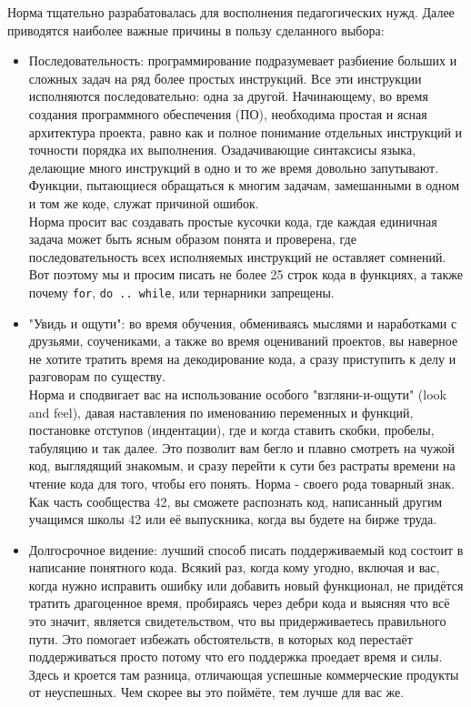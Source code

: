\documentclass{42-ru}
\begin{document}
    Норма тщательно разрабатовалась для восполнения педагогических нужд.
    Далее приводятся наиболее важные причины в пользу сделанного выбора:
    \begin{itemize}

        \item Последовательность: программирование подразумевает разбиение больших и сложных задач
            на ряд более простых инструкций. Все эти инструкции исполняются последовательно:
            одна за другой. Начинающему, во время создания программного обеспечения (ПО), необходима
            простая и ясная архитектура проекта, равно как и полное понимание отдельных инструкций и
            точности порядка их выполнения. Озадачивающие синтаксисы языка, делающие много инструкций
            в одно и то же время довольно запутывают. Функции, пытающиеся обращаться к многим задачам,
            замешанными в одном и том же коде, служат причиной ошибок.\\
            Норма просит вас создавать простые кусочки кода, где каждая единичная задача может быть
            ясным образом понята и проверена, где последовательность всех исполняемых инструкций
            не оставляет сомнений. Вот поэтому мы и просим писать не более 25 строк кода в функциях,
            а также почему \texttt{for}, \texttt{do .. while}, или тернарники запрещены.

        \item "Увидь и ощути": во время обучения, обмениваясь мыслями и наработками с друзьями,
            соучениками, а также во время оцениваний проектов, вы наверное не хотите тратить время
            на декодирование кода, а сразу приступить к делу и разговорам по существу.\\
            Норма и сподвигает вас на использование особого "взгляни-и-ощути" (look and feel),
            давая наставления по именованию переменных и функций, постановке отступов (индентации),
            где и когда ставить скобки, пробелы, табуляцию и так далее.
            Это позволит вам бегло и плавно смотреть на чужой код, выглядящий знакомым, и сразу перейти
            к сути без растраты времени на чтение кода для того, чтобы его понять.
            Норма - своего рода товарный знак. Как часть сообщества 42, вы сможете распознать код,
            написанный другим учащимся школы 42 или её выпускника, когда вы будете на бирже труда.
    
        \item Долгосрочное видение: лучший способ писать поддерживаемый код состоит в написание понятного кода.
            Всякий раз, когда кому угодно, включая и вас, когда нужно исправить ошибку или добавить новый функционал,
            не придётся тратить драгоценное время, пробираясь через дебри кода и выясняя что всё это значит,
            является свидетельством, что вы придерживаетесь правильного пути. Это помогает избежать обстоятельств,
            в которых код перестаёт поддерживаться просто потому что его поддержка проедает время и силы.
            Здесь и кроется там разница, отличающая успешные коммерческие продукты от неуспешных.
            Чем скорее вы это поймёте, тем лучше для вас же.


\end{itemize}
\end{document}
